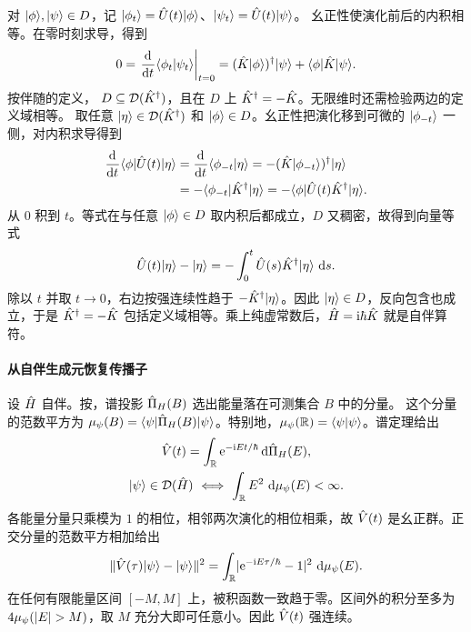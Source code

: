 对 $\lvert\phi\rangle,\lvert\psi\rangle \in D$，记 $\lvert\phi_t\rangle = \hat{U}(t)\lvert\phi\rangle$、$\lvert\psi_t\rangle = \hat{U}(t)\lvert\psi\rangle$。
幺正性使演化前后的内积相等。在零时刻求导，得到
\[
    0 = \left.\frac{\mathop{}\!\mathrm{d}^{}}{\mathrm{d}{t}^{}}\langle\phi_t\vert\psi_t\rangle\right|_{t=0}
      = (\hat{K}\lvert\phi\rangle)^\dagger\lvert\psi\rangle + \langle\phi\vert\hat{K}\vert\psi\rangle.
\]
按伴随的定义，
$D \subseteq \mathcal D(\hat{K}^\dagger)$，且在 $D$ 上 $\hat{K}^\dagger = -\hat{K}$。无限维时还需检验两边的定义域相等。
取任意 $\lvert\eta\rangle \in \mathcal D(\hat{K}^\dagger)$ 和 $\lvert\phi\rangle \in D$。幺正性把演化移到可微的 $\lvert\phi_{-t}\rangle$ 一侧，对内积求导得到
\begin{align*}
    \frac{\mathop{}\!\mathrm{d}^{}}{\mathrm{d}{t}^{}}\langle\phi\vert\hat{U}(t)\vert\eta\rangle
    &= \frac{\mathop{}\!\mathrm{d}^{}}{\mathrm{d}{t}^{}}\langle\phi_{-t}\vert\eta\rangle
     = -(\hat{K}\lvert\phi_{-t}\rangle)^\dagger\lvert\eta\rangle\\
    &= -\langle\phi_{-t}\vert\hat{K}^\dagger\vert\eta\rangle
     = -\langle\phi\vert\hat{U}(t)\hat{K}^\dagger\vert\eta\rangle.
\end{align*}
从 $0$ 积到 $t$。等式在与任意 $\lvert\phi\rangle \in D$ 取内积后都成立，$D$ 又稠密，故得到向量等式
\[
    \hat{U}(t)\lvert\eta\rangle - \lvert\eta\rangle = -\int_0^t\hat{U}(s)\hat{K}^\dagger\lvert\eta\rangle\,\mathop{}\!\mathrm{d} s.
\]
除以 $t$ 并取 $t \to 0$，右边按强连续性趋于 $-\hat{K}^\dagger\lvert\eta\rangle$。因此 $\lvert\eta\rangle \in D$，反向包含也成立，于是
$\hat{K}^\dagger = -\hat{K}$ 包括定义域相等。乘上纯虚常数后，$\hat{H} = \mathrm{i}\hbar\hat{K}$ 就是自伴算符。

\paragraph*{从自伴生成元恢复传播子}
设 $\hat{H}$ 自伴。按，谱投影 $\hat{\Pi}_H(B)$ 选出能量落在可测集合 $B$ 中的分量。
这个分量的范数平方为 $\mu_\psi(B) = \langle\psi\vert\hat{\Pi}_H(B)\vert\psi\rangle$。特别地，$\mu_\psi(\mathbb{R}) = \langle\psi\vert\psi\rangle$。谱定理给出
\begin{subequations}\label{eq:qm-propagator-spectral-integral}
    \begin{gather}
        \hat{V}(t) = \int_{\mathbb{R}}\mathop{}\!\mathrm{e}^{-\mathrm{i} Et/\hbar}\mathop{}\!\mathrm{d}\hat{\Pi}_H(E),\\
        \lvert\psi\rangle \in \mathcal D(\hat{H})\  \Longleftrightarrow \
            \int_{\mathbb{R}} E^2\,\mathop{}\!\mathrm{d}\mu_\psi(E) < \infty .
    \end{gather}
\end{subequations}
各能量分量只乘模为 $1$ 的相位，相邻两次演化的相位相乘，故 $\hat{V}(t)$ 是幺正群。正交分量的范数平方相加给出
\[
    \lVert\hat{V}(\tau)\lvert\psi\rangle - \lvert\psi\rangle\rVert^2
    = \int_{\mathbb{R}}\lvert\mathop{}\!\mathrm{e}^{-\mathrm{i} E\tau/\hbar} - 1\rvert^2\,\mathop{}\!\mathrm{d}\mu_\psi(E).
\]
在任何有限能量区间 $[-M,M]$ 上，被积函数一致趋于零。区间外的积分至多为 $4\mu_\psi(\lvert E\rvert > M)$，取 $M$ 充分大即可任意小。因此 $\hat{V}(t)$ 强连续。

